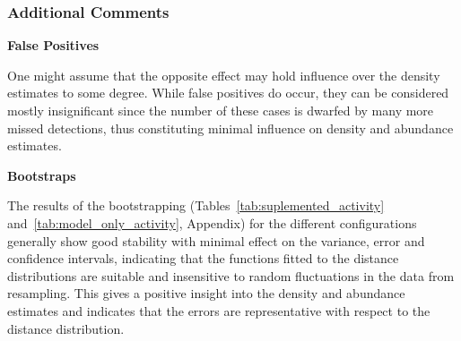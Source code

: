 \subsubsection{Additional Comments}

\textbf{False Positives}

One might assume that the opposite effect may hold influence over the density estimates to
some degree.
While false positives do occur, they can be considered mostly insignificant since the number
of these cases is dwarfed by many more missed detections, thus constituting minimal influence
on density and abundance estimates.

\vspace{5mm}
\textbf{Bootstraps}

The results of the bootstrapping (Tables~\ref{tab:suplemented_activity} and~\ref{tab:model_only_activity},
Appendix) for the different configurations generally show good stability
with minimal effect on the variance, error and confidence intervals, indicating that the functions
fitted to the distance distributions are suitable and insensitive to random fluctuations in
the data from resampling.
This gives a positive insight into the density and abundance estimates and indicates that the errors
are representative with respect to the distance distribution.\cite{distance_samping}
